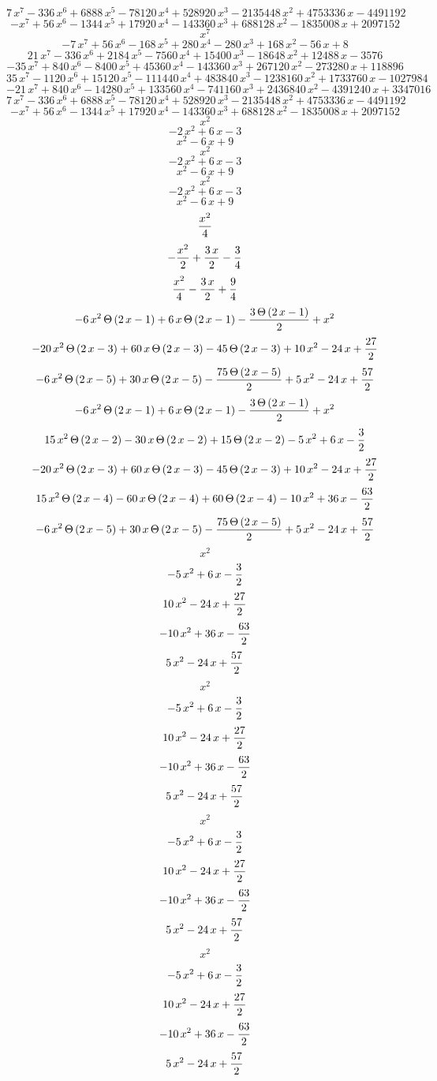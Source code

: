 $$7\,x^7-336\,x^6+6888\,x^5-78120\,x^4+528920\,x^3-2135448\,x^2+
 4753336\,x-4491192$$
$$-x^7+56\,x^6-1344\,x^5+17920\,x^4-143360\,x^3+688128\,x^2-1835008\,
 x+2097152$$
$$x^7$$
$$-7\,x^7+56\,x^6-168\,x^5+280\,x^4-280\,x^3+168\,x^2-56\,x+8$$
$$21\,x^7-336\,x^6+2184\,x^5-7560\,x^4+15400\,x^3-18648\,x^2+12488\,x
 -3576$$
$$-35\,x^7+840\,x^6-8400\,x^5+45360\,x^4-143360\,x^3+267120\,x^2-
 273280\,x+118896$$
$$35\,x^7-1120\,x^6+15120\,x^5-111440\,x^4+483840\,x^3-1238160\,x^2+
 1733760\,x-1027984$$
$$-21\,x^7+840\,x^6-14280\,x^5+133560\,x^4-741160\,x^3+2436840\,x^2-
 4391240\,x+3347016$$
$$7\,x^7-336\,x^6+6888\,x^5-78120\,x^4+528920\,x^3-2135448\,x^2+
 4753336\,x-4491192$$
$$-x^7+56\,x^6-1344\,x^5+17920\,x^4-143360\,x^3+688128\,x^2-1835008\,
 x+2097152$$
$$x^2$$
$$-2\,x^2+6\,x-3$$
$$x^2-6\,x+9$$
$$x^2$$
$$-2\,x^2+6\,x-3$$
$$x^2-6\,x+9$$
$$x^2$$
$$-2\,x^2+6\,x-3$$
$$x^2-6\,x+9$$
$${{x^2}\over{4}}$$
$$-{{x^2}\over{2}}+{{3\,x}\over{2}}-{{3}\over{4}}$$
$${{x^2}\over{4}}-{{3\,x}\over{2}}+{{9}\over{4}}$$
$$-6\,x^2\,\Theta\left(2\,x-1\right)+6\,x\,\Theta\left(2\,x-1\right)-
 {{3\,\Theta\left(2\,x-1\right)}\over{2}}+x^2$$
$$-20\,x^2\,\Theta\left(2\,x-3\right)+60\,x\,\Theta\left(2\,x-3
 \right)-45\,\Theta\left(2\,x-3\right)+10\,x^2-24\,x+{{27}\over{2}}$$
$$-6\,x^2\,\Theta\left(2\,x-5\right)+30\,x\,\Theta\left(2\,x-5\right)
 -{{75\,\Theta\left(2\,x-5\right)}\over{2}}+5\,x^2-24\,x+{{57}\over{2
 }}$$
$$-6\,x^2\,\Theta\left(2\,x-1\right)+6\,x\,\Theta\left(2\,x-1\right)-
 {{3\,\Theta\left(2\,x-1\right)}\over{2}}+x^2$$
$$15\,x^2\,\Theta\left(2\,x-2\right)-30\,x\,\Theta\left(2\,x-2\right)
 +15\,\Theta\left(2\,x-2\right)-5\,x^2+6\,x-{{3}\over{2}}$$
$$-20\,x^2\,\Theta\left(2\,x-3\right)+60\,x\,\Theta\left(2\,x-3
 \right)-45\,\Theta\left(2\,x-3\right)+10\,x^2-24\,x+{{27}\over{2}}$$
$$15\,x^2\,\Theta\left(2\,x-4\right)-60\,x\,\Theta\left(2\,x-4\right)
 +60\,\Theta\left(2\,x-4\right)-10\,x^2+36\,x-{{63}\over{2}}$$
$$-6\,x^2\,\Theta\left(2\,x-5\right)+30\,x\,\Theta\left(2\,x-5\right)
 -{{75\,\Theta\left(2\,x-5\right)}\over{2}}+5\,x^2-24\,x+{{57}\over{2
 }}$$
$$x^2$$
$$-5\,x^2+6\,x-{{3}\over{2}}$$
$$10\,x^2-24\,x+{{27}\over{2}}$$
$$-10\,x^2+36\,x-{{63}\over{2}}$$
$$5\,x^2-24\,x+{{57}\over{2}}$$
$$x^2$$
$$-5\,x^2+6\,x-{{3}\over{2}}$$
$$10\,x^2-24\,x+{{27}\over{2}}$$
$$-10\,x^2+36\,x-{{63}\over{2}}$$
$$5\,x^2-24\,x+{{57}\over{2}}$$
$$x^2$$
$$-5\,x^2+6\,x-{{3}\over{2}}$$
$$10\,x^2-24\,x+{{27}\over{2}}$$
$$-10\,x^2+36\,x-{{63}\over{2}}$$
$$5\,x^2-24\,x+{{57}\over{2}}$$
$$x^2$$
$$-5\,x^2+6\,x-{{3}\over{2}}$$
$$10\,x^2-24\,x+{{27}\over{2}}$$
$$-10\,x^2+36\,x-{{63}\over{2}}$$
$$5\,x^2-24\,x+{{57}\over{2}}$$
